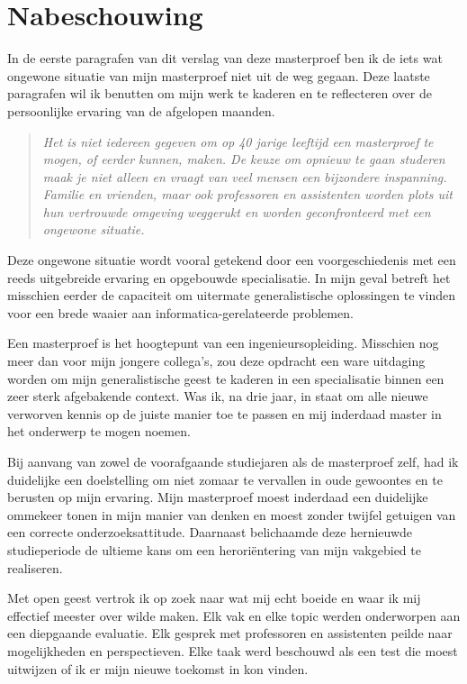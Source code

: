 
\chapter*{Nabeschouwing}
\label{nabeschouwing}

In de eerste paragrafen van dit verslag van deze masterproef ben ik de iets wat
ongewone situatie van mijn masterproef niet uit de weg gegaan. Deze laatste
paragrafen wil ik benutten om mijn werk te kaderen en te reflecteren over de
persoonlijke ervaring van de afgelopen maanden.

\begin{quote}
\emph{Het is niet iedereen gegeven om op 40 jarige leeftijd een masterproef te
mogen, of eerder kunnen, maken. De keuze om opnieuw te gaan studeren maak je
niet alleen en vraagt van veel mensen een bijzondere inspanning. Familie en
vrienden, maar ook professoren en assistenten worden plots uit hun vertrouwde
omgeving weggerukt en worden geconfronteerd met een ongewone situatie.}
\end{quote}

Deze ongewone situatie wordt vooral getekend door een voorgeschiedenis met een
reeds uitgebreide ervaring en opgebouwde specialisatie. In mijn geval betreft
het misschien eerder de capaciteit om uitermate generalistische oplossingen te
vinden voor een brede waaier aan informatica-gerelateerde problemen.

Een masterproef is het hoogtepunt van een ingenieursopleiding. Misschien nog
meer dan voor mijn jongere collega's, zou deze opdracht een ware uitdaging
worden om mijn generalistische geest te kaderen in een specialisatie binnen een
zeer sterk afgebakende context. Was ik, na drie jaar, in staat om alle nieuwe
verworven kennis op de juiste manier toe te passen en mij inderdaad master in
het onderwerp te mogen noemen.

Bij aanvang van zowel de voorafgaande studiejaren als de masterproef zelf, had
ik duidelijke een doelstelling om niet zomaar te vervallen in oude gewoontes en
te berusten op mijn ervaring. Mijn masterproef moest inderdaad een duidelijke
ommekeer tonen in mijn manier van denken en moest zonder twijfel getuigen van
een correcte onderzoeksattitude. Daarnaast belichaamde deze hernieuwde
studieperiode de ultieme kans om een herori\"entering van mijn vakgebied te
realiseren.

Met open geest vertrok ik op zoek naar wat mij echt boeide en waar ik mij
effectief meester over wilde maken. Elk vak en elke topic werden onderworpen
aan een diepgaande evaluatie. Elk gesprek met professoren en assistenten peilde
naar mogelijkheden en perspectieven. Elke taak werd beschouwd als een test die
moest uitwijzen of ik er mijn nieuwe toekomst in kon vinden.

